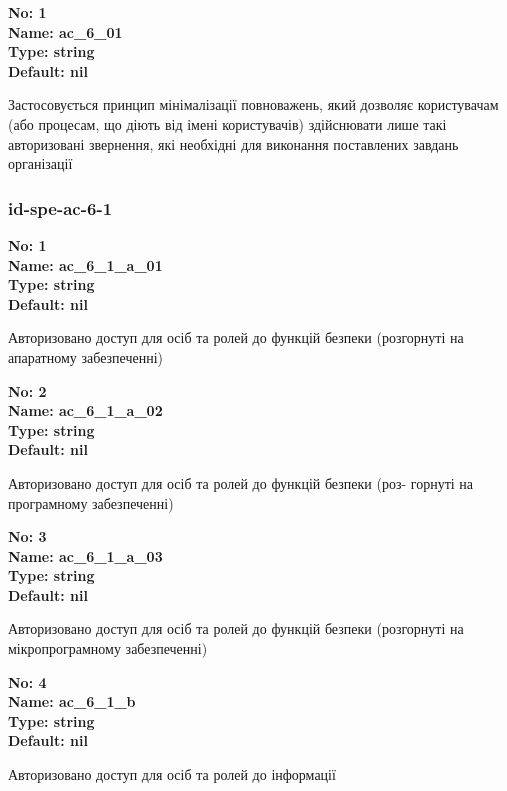 \documentclass{article}
\begin{document}
\vspace{10pt}
{\footnotesize\bfseries
No: 1\\
Name: ac\_\allowbreak{}6\_\allowbreak{}01\\
Type: string\\
Default: nil
}

{\footnotesize Застосовується принцип мінімалізації повноважень, який дозволяє користувачам (або процесам, що діють від імені користувачів) здійснювати лише такі авторизовані звернення, які необхідні для виконання поставлених завдань організації}




\subsubsection{id-spe-ac-6-1}


\vspace{10pt}
{\footnotesize\bfseries
No: 1\\
Name: ac\_\allowbreak{}6\_\allowbreak{}1\_\allowbreak{}a\_\allowbreak{}01\\
Type: string\\
Default: nil
}

{\footnotesize Авторизовано доступ для осіб та ролей до функцій безпеки (розгорнуті на апаратному забезпеченні)}


{\footnotesize\bfseries
No: 2\\
Name: ac\_\allowbreak{}6\_\allowbreak{}1\_\allowbreak{}a\_\allowbreak{}02\\
Type: string\\
Default: nil
}

{\footnotesize Авторизовано доступ для осіб та ролей до функцій безпеки (роз- горнуті на програмному забезпеченні)}


{\footnotesize\bfseries
No: 3\\
Name: ac\_\allowbreak{}6\_\allowbreak{}1\_\allowbreak{}a\_\allowbreak{}03\\
Type: string\\
Default: nil
}

{\footnotesize Авторизовано доступ для осіб та ролей до функцій безпеки (розгорнуті на мікропрограмному забезпеченні)}


{\footnotesize\bfseries
No: 4\\
Name: ac\_\allowbreak{}6\_\allowbreak{}1\_\allowbreak{}b\\
Type: string\\
Default: nil
}

{\footnotesize Авторизовано доступ для осіб та ролей до інформації}
\end{document}
